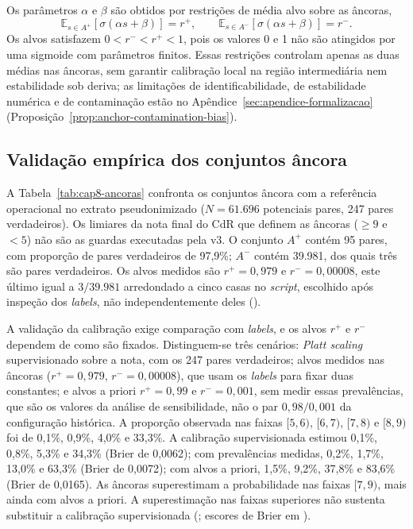 Os parâmetros $\alpha$ e $\beta$ são obtidos por restrições de média alvo sobre as âncoras,
\[
\mathbb{E}_{s\in A^+}[\sigma(\alpha s+\beta)] = r^+,
\qquad
\mathbb{E}_{s\in A^-}[\sigma(\alpha s+\beta)] = r^-.
\]
Os alvos satisfazem $0<r^-<r^+<1$, pois os valores 0 e 1 não são atingidos por uma sigmoide com parâmetros finitos. Essas restrições controlam apenas as duas médias nas âncoras, sem garantir calibração local na região intermediária nem estabilidade sob deriva; as limitações de identificabilidade, de estabilidade numérica e de contaminação estão no Apêndice~\ref{sec:apendice-formalizacao} (Proposição~\ref{prop:anchor-contamination-bias}).

\subsection{Validação empírica dos conjuntos âncora}
\label{sec:e4-validacao-ancoras}

A Tabela~\ref{tab:cap8-ancoras} confronta os conjuntos âncora com a referência operacional no extrato pseudonimizado ($N=61.696$ potenciais pares, 247 pares verdadeiros). Os limiares da nota final do CdR que definem as âncoras ($\geq9$ e $<5$) não são as guardas executadas pela v3. O conjunto $A^+$ contém 95 pares, com proporção de pares verdadeiros de 97,9\%; $A^-$ contém 39.981, dos quais três são pares verdadeiros. Os alvos medidos são $r^+=0{,}979$ e $r^-=0{,}00008$, este último igual a $3/39.981$ arredondado a cinco casas no \textit{script}, escolhido após inspeção dos \textit{labels}, não independentemente deles ().



A validação da calibração exige comparação com \textit{labels}, e os alvos $r^+$ e $r^-$ dependem de como são fixados. Distinguem-se três cenários: \textit{Platt scaling} supervisionado sobre a nota, com os 247 pares verdadeiros; alvos medidos nas âncoras ($r^+=0{,}979$, $r^-=0{,}00008$), que usam os \textit{labels} para fixar duas constantes; e alvos a priori $r^+=0{,}99$ e $r^-=0{,}001$, sem medir essas prevalências, que são os valores da análise de sensibilidade, não o par $0{,}98/0{,}001$ da configuração histórica. A proporção observada nas faixas $[5,6)$, $[6,7)$, $[7,8)$ e $[8,9)$ foi de 0,1\%, 0,9\%, 4,0\% e 33,3\%. A calibração supervisionada estimou 0,1\%, 0,8\%, 5,3\% e 34,3\% (Brier de 0,0062); com prevalências medidas, 0,2\%, 1,7\%, 13,0\% e 63,3\% (Brier de 0,0072); com alvos a priori, 1,5\%, 9,2\%, 37,8\% e 83,6\% (Brier de 0,0165). As âncoras superestimam a probabilidade nas faixas $[7,9)$, mais ainda com alvos a priori. A superestimação nas faixas superiores não sustenta substituir a calibração supervisionada (; escores de Brier em ).

